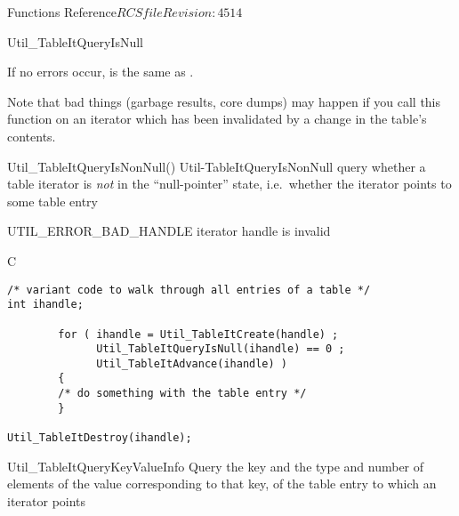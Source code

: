 \begin{cactuspart}{ Functions Reference}{$RCSfile$}{$Revision: 4514 $}
\begin{FunctionDescription}{Util\_TableItQueryIsNull}
\begin{Discussion}
If no errors occur,
is the same as
.

Note that bad things (garbage results, core dumps) may happen if
you call this function on an iterator which has been invalidated
by a change in the table's contents.
\end{Discussion}

\begin{SeeAlsoSection}
\begin{SeeAlso2} {Util\_TableItQueryIsNonNull()} {Util-TableItQueryIsNonNull}
query whether a table iterator is {\em not\/} in the ``null-pointer'' state,
i.e.\ whether the iterator points to some table entry
\end{SeeAlso2}
\end{SeeAlsoSection}

\begin{ErrorSection}
\begin{Error}{UTIL\_ERROR\_BAD\_HANDLE}
iterator handle is invalid
\end{Error}
\end{ErrorSection}

\begin{ExampleSection}
\begin{Example}{C}
\begin{verbatim}
/* variant code to walk through all entries of a table */
int ihandle;

        for ( ihandle = Util_TableItCreate(handle) ;
              Util_TableItQueryIsNull(ihandle) == 0 ;
              Util_TableItAdvance(ihandle) )
        {
        /* do something with the table entry */
        }

Util_TableItDestroy(ihandle);
\end{verbatim}
\end{Example}
\end{ExampleSection}
\end{FunctionDescription}


\begin{FunctionDescription}{Util\_TableItQueryKeyValueInfo}
\label{Util-TableItQueryKeyValueInfo}
Query the key and the type and number of elements of the value
corresponding to that key, of the table entry to which an iterator points


\end{FunctionDescription}
\end{cactuspart}
